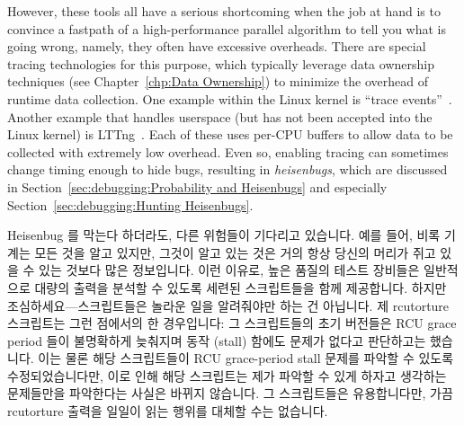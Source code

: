 However, these tools all have a serious shortcoming when the job at hand
is to convince a fastpath of a high-performance parallel algorithm
to tell you what is going wrong, namely, they often have excessive
overheads.
There are special tracing technologies for this purpose, which typically
leverage data ownership techniques
(see Chapter~\ref{chp:Data Ownership})
to minimize the overhead of runtime data collection.
One example within the Linux kernel is
``trace events''~\cite{StevenRostedt2010perfTraceEventP1,StevenRostedt2010perfTraceEventP2,StevenRostedt2010perfTraceEventP3,StevenRostedt2010perfHP+DeathlyMacros}.
Another example that handles userspace (but has not been accepted into
the Linux kernel) is LTTng~\cite{MathieuDesnoyers2009LFCollabSummit}.
Each of these uses per-CPU buffers to allow data to be collected with
extremely low overhead.
Even so, enabling tracing can sometimes change timing enough to
hide bugs, resulting in \emph{heisenbugs}, which are discussed in
Section~\ref{sec:debugging:Probability and Heisenbugs}
and especially Section~\ref{sec:debugging:Hunting Heisenbugs}.
\fi

Heisenbug 를 막는다 하더라도, 다른 위험들이 기다리고 있습니다.
예를 들어, 비록 기계는 모든 것을 알고 있지만, 그것이 알고 있는 것은 거의 항상
당신의 머리가 쥐고 있을 수 있는 것보다 많은 정보입니다.
이런 이유로, 높은 품질의 테스트 장비들은 일반적으로 대량의 출력을 분석할 수
있도록 세련된 스크립트들을 함께 제공합니다.
하지만 조심하세요---스크립트들은 놀라운 일을 알려줘야만 하는 건 아닙니다.
제 rcutorture 스크립트는 그런 점에서의 한 경우입니다: 그 스크립트들의 초기
버전들은 RCU grace period 들이 불명확하게 늦춰지며 동작 (stall) 함에도 문제가
없다고 판단하고는 했습니다.
이는 물론 해당 스크립트들이 RCU grace-period stall 문제를 파악할 수 있도록
수정되었습니다만, 이로 인해 해당 스크립트는 제가 파악할 수 있게 하자고 생각하는
문제들만을 파악한다는 사실은 바뀌지 않습니다.
그 스크립트들은 유용합니다만, 가끔 rcutorture 출력을 일일이 읽는 행위를 대체할
수는 없습니다.

